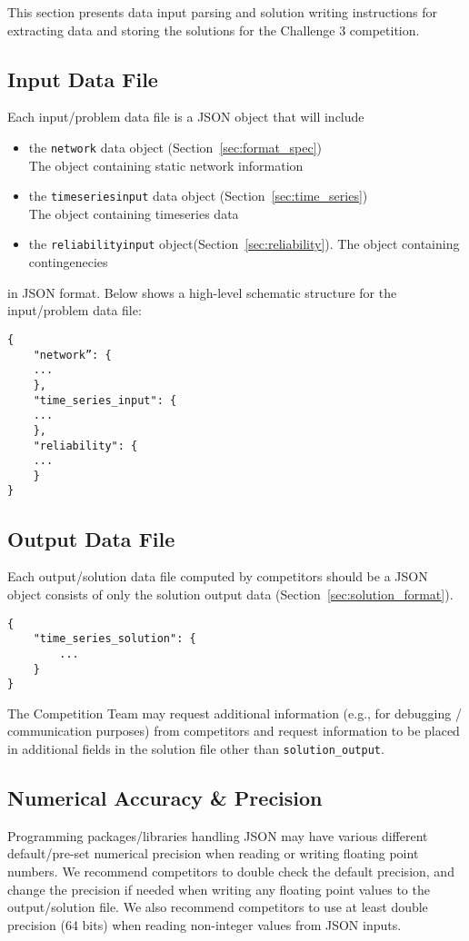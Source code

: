This section presents data input parsing and solution writing instructions for
extracting data and storing the solutions 
for the Challenge 3 competition.

\subsection{Input Data File}
Each input/problem data file is a JSON object that will include
\begin{itemize}
    \item the \texttt{network} data object (Section~\ref{sec:format_spec})\\
        The object containing static network information
    \item the \texttt{timeseriesinput} data object (Section~\ref{sec:time_series})\\
        The object containing timeseries data
    \item the \texttt{reliabilityinput} object(Section~\ref{sec:reliability}).
        The object containing contingenecies
\end{itemize}
in JSON format. Below shows a high-level schematic structure for the input/problem data file:
\begin{verbatim}
{
    "network”: {
    ...
    },
    "time_series_input": {
    ...
    },
    "reliability": {
    ... 
    }
}
\end{verbatim}

\subsection{Output Data File}
Each output/solution data file computed by competitors should be a JSON object consists of only 
the solution output data (Section~\ref{sec:solution_format}).
\begin{verbatim}
{
    "time_series_solution": {
        ...
    }    
}
\end{verbatim}
The Competition Team may request additional information (e.g., for debugging / communication purposes)
from competitors and request information to be placed in 
additional fields in the solution file other than \texttt{solution\_output}. 

\subsection{Numerical Accuracy \& Precision}
Programming packages/libraries handling JSON may have various different 
default/pre-set numerical precision when reading or writing floating point numbers.
We recommend competitors to 
double check the default precision,
and change the precision if needed
when writing any floating point values to the output/solution file.
We also recommend competitors to use at least double precision (64 bits) 
when reading non-integer values from JSON inputs. 


